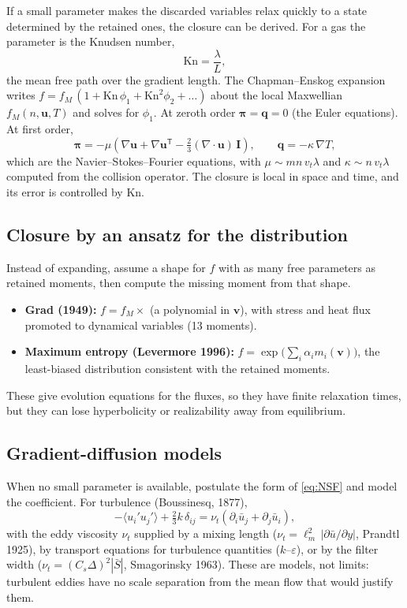 \documentclass[11pt]{article}
\newcommand{\vt}{v_t}
\newcommand{\Kn}{\mathrm{Kn}}
\newcommand{\avg}[1]{\langle #1 \rangle}
\newcommand{\bu}{\mathbf{u}}
\newcommand{\bv}{\mathbf{v}}
\newcommand{\bq}{\mathbf{q}}
\begin{document}
If a small parameter makes the discarded variables relax quickly to a state
determined by the retained ones, the closure can be derived. For a gas the
parameter is the Knudsen number,
\begin{equation}
  \Kn = \frac{\lambda}{L},
\end{equation}
the mean free path over the gradient length. The Chapman--Enskog expansion
writes $f = f_M\,(1 + \Kn\,\phi_1 + \Kn^2\phi_2 + \dots)$ about the local
Maxwellian $f_M(n,\bu,T)$ and solves for $\phi_1$. At zeroth order
$\boldsymbol{\pi} = \bq = 0$ (the Euler equations). At first order,
\begin{equation}
  \boldsymbol{\pi} = -\mu\left(\nabla\bu + \nabla\bu^{\mathsf T}
     - \tfrac{2}{3}(\nabla\cdot\bu)\,\mathbf{I}\right),
  \qquad
  \bq = -\kappa\,\nabla T ,
  \label{eq:NSF}
\end{equation}
which are the Navier--Stokes--Fourier equations, with
$\mu \sim mn\,\vt\lambda$ and $\kappa \sim n\,\vt\lambda$ computed from the
collision operator. The closure is local in space and time, and its error is
controlled by $\Kn$.

\subsection{Closure by an ansatz for the distribution}

Instead of expanding, assume a shape for $f$ with as many free parameters as
retained moments, then compute the missing moment from that shape.
\begin{itemize}
  \item \textbf{Grad (1949):} $f = f_M \times$ (a polynomial in $\bv$), with
    stress and heat flux promoted to dynamical variables (13 moments).
  \item \textbf{Maximum entropy (Levermore 1996):}
    $f = \exp\bigl(\sum_i \alpha_i m_i(\bv)\bigr)$, the least-biased
    distribution consistent with the retained moments.
\end{itemize}
These give evolution equations for the fluxes, so they have finite relaxation
times, but they can lose hyperbolicity or realizability away from
equilibrium.

\subsection{Gradient-diffusion models}

When no small parameter is available, postulate the form of \eqref{eq:NSF}
and model the coefficient. For turbulence (Boussinesq, 1877),
\begin{equation}
  -\avg{u_i'u_j'} + \tfrac{2}{3}k\,\delta_{ij}
  = \nu_t\left(\partial_i \bar u_j + \partial_j \bar u_i\right),
\end{equation}
with the eddy viscosity $\nu_t$ supplied by a mixing length
($\nu_t = \ell_m^2\,|\partial \bar u/\partial y|$, Prandtl 1925), by
transport equations for turbulence quantities ($k$--$\varepsilon$), or by the
filter width ($\nu_t = (C_s\Delta)^2|\bar S|$, Smagorinsky 1963). These are
models, not limits: turbulent eddies have no scale separation from the mean
flow that would justify them.
\end{document}
